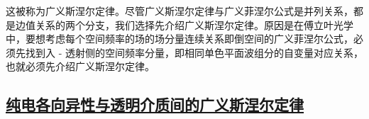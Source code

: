 这被称为广义斯涅尔定律。尽管广义斯涅尔定律与广义菲涅尔公式是并列关系，都是边值关系的两个分支，我们选择先介绍广义斯涅尔定律。原因是在傅立叶光学中，要想考虑每个空间频率的场的场分量连续关系即倒空间的广义菲涅尔公式，必须先找到入 - 透射侧的空间频率分量，即相同单色平面波组分的自变量对应关系，也就必须先介绍广义斯涅尔定律。

\subsection{\protect\hyperlink{chap:\thesubsection}{纯电各向异性与透明介质间的广义斯涅尔定律}}
\label{纯电各向异性与透明介质间的广义斯涅尔定律}

